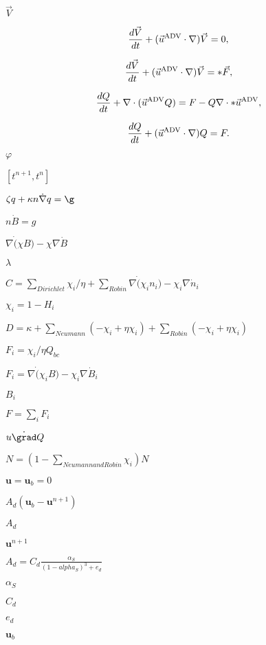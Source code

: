 \documentclass{article}
\begin{document}
$ \vec{V} $
\pagebreak

\[ \frac{d\vec{V}}{dt} + (\vec{u}^{\mbox{\scriptsize ADV}} \cdot \nabla)\vec{V} = 0, \]
\pagebreak

\[ \frac{d\vec{V}}{dt} + (\vec{u}^{\mbox{\scriptsize ADV}} \cdot \nabla)\vec{V} = *\vec{F}, \]
\pagebreak

\[ \frac{dQ}{dt} + \nabla \cdot (\vec{u}^{\mbox{\scriptsize ADV}} Q) = F - Q \nabla \cdot *\vec{u}^{\mbox{\scriptsize ADV}}, \]
\pagebreak

\[ \frac{dQ}{dt} + (\vec{u}^{\mbox{\scriptsize ADV}} \cdot \nabla) Q = F. \]
\pagebreak

$ \varphi $
\pagebreak

$ [t^{n+1}, t^n] $
\pagebreak

$ \zeta q + \kappa n \dot \nabla q = \g $
\pagebreak

$ n \dot B = g $
\pagebreak

$ \nabla \dot (\chi B) - \chi \nabla \dot B $
\pagebreak

$\lambda$
\pagebreak

$ C = \sum_{Dirichlet} \chi_i/\eta + \sum_{Robin} \nabla \dot (\chi_i n_i) - \chi_i \nabla \dot n_i$
\pagebreak

$\chi_i = 1-H_i$
\pagebreak

$ D = \kappa + \sum_{Neumann} (-\chi_i + \eta \chi_i) + \sum_{Robin} (-\chi_i + \eta \chi_i)$
\pagebreak

$ F_i = \chi_i/\eta Q_{bc}$
\pagebreak

$ F_i = \nabla \dot (\chi_i B) - \chi_i \nabla \dot B_i $
\pagebreak

$B_i$
\pagebreak

$F = \sum_{i} F_i$
\pagebreak

$ u \dot \grad Q$
\pagebreak

$ N = (1-\sum_{Neumann and Robin} \chi_i) N$
\pagebreak

$ \bm{u}=\bm{u}_b = 0$
\pagebreak

$ A_d(\bm{u}_b - \bm{u}^{n+1}) $
\pagebreak

$A_d $
\pagebreak

$ \bm{u}^{n+1} $
\pagebreak

$ A_d = C_d\frac{\alpha_S}{(1-alpha_S)^3+e_d}$
\pagebreak

$ \alpha_S $
\pagebreak

$ C_d$
\pagebreak

$ e_d$
\pagebreak

$\bm{u}_b$
\pagebreak
\end{document}
